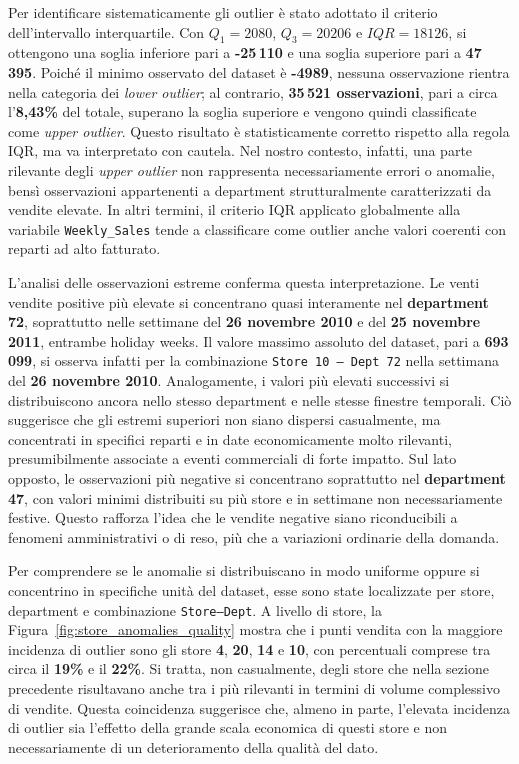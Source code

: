 \documentclass[a4paper,12pt]{article}
\begin{document}
Per identificare sistematicamente gli outlier è stato adottato il criterio dell’intervallo interquartile. Con \(Q_1 = 2080\), \(Q_3 = 20206\) e \(IQR = 18126\), si ottengono una soglia inferiore pari a \textbf{-25\,110} e una soglia superiore pari a \textbf{47\,395}. Poiché il minimo osservato del dataset è \textbf{-4989}, nessuna osservazione rientra nella categoria dei \textit{lower outlier}; al contrario, \textbf{35\,521 osservazioni}, pari a circa l’\textbf{8,43\%} del totale, superano la soglia superiore e vengono quindi classificate come \textit{upper outlier}. Questo risultato è statisticamente corretto rispetto alla regola IQR, ma va interpretato con cautela. Nel nostro contesto, infatti, una parte rilevante degli \textit{upper outlier} non rappresenta necessariamente errori o anomalie, bensì osservazioni appartenenti a department strutturalmente caratterizzati da vendite elevate. In altri termini, il criterio IQR applicato globalmente alla variabile \texttt{Weekly\_Sales} tende a classificare come outlier anche valori coerenti con reparti ad alto fatturato.

L’analisi delle osservazioni estreme conferma questa interpretazione. Le venti vendite positive più elevate si concentrano quasi interamente nel \textbf{department 72}, soprattutto nelle settimane del \textbf{26 novembre 2010} e del \textbf{25 novembre 2011}, entrambe holiday weeks. Il valore massimo assoluto del dataset, pari a \textbf{693\,099}, si osserva infatti per la combinazione \texttt{Store 10 -- Dept 72} nella settimana del \textbf{26 novembre 2010}. Analogamente, i valori più elevati successivi si distribuiscono ancora nello stesso department e nelle stesse finestre temporali. Ciò suggerisce che gli estremi superiori non siano dispersi casualmente, ma concentrati in specifici reparti e in date economicamente molto rilevanti, presumibilmente associate a eventi commerciali di forte impatto. Sul lato opposto, le osservazioni più negative si concentrano soprattutto nel \textbf{department 47}, con valori minimi distribuiti su più store e in settimane non necessariamente festive. Questo rafforza l’idea che le vendite negative siano riconducibili a fenomeni amministrativi o di reso, più che a variazioni ordinarie della domanda.

Per comprendere se le anomalie si distribuiscano in modo uniforme oppure si concentrino in specifiche unità del dataset, esse sono state localizzate per store, department e combinazione \texttt{Store--Dept}. A livello di store, la Figura~\ref{fig:store_anomalies_quality} mostra che i punti vendita con la maggiore incidenza di outlier sono gli store \textbf{4}, \textbf{20}, \textbf{14} e \textbf{10}, con percentuali comprese tra circa il \textbf{19\%} e il \textbf{22\%}. Si tratta, non casualmente, degli store che nella sezione precedente risultavano anche tra i più rilevanti in termini di volume complessivo di vendite. Questa coincidenza suggerisce che, almeno in parte, l’elevata incidenza di outlier sia l’effetto della grande scala economica di questi store e non necessariamente di un deterioramento della qualità del dato.
\end{document}
